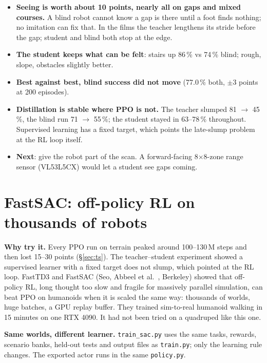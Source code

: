 \documentclass[10pt,letterpaper]{article}
\newcommand{\key}[1]{\textbf{#1}}
\begin{document}
\begin{itemize}
\item \key{Seeing is worth about 10 points, nearly all on gaps and mixed courses.} A blind robot cannot know a gap is there until a
foot finds nothing; no imitation can fix that. In the films the teacher lengthens its stride before the gap; student and blind both
stop at the edge.
\item \key{The student keeps what can be felt}: stairs up 86\,\% vs 74\,\% blind; rough, slope, obstacles slightly better.
\item \key{Best against best, blind success did not move} (77.0\,\% both, $\pm$3 points at 200 episodes).
\item \key{Distillation is stable where PPO is not.} The teacher slumped 81 $\to$ 45\,\%, the blind run 71 $\to$ 55\,\%; the student
stayed in 63–78\,\% throughout. Supervised learning has a fixed target, which points the late-slump problem at the RL loop itself.
\item \key{Next}: give the robot part of the scan. A forward-facing 8$\times$8-zone range sensor (VL53L5CX) would let a student see gaps coming.
\end{itemize}

\section{FastSAC: off-policy RL on thousands of robots}\label{sec:fsac}

\textbf{Why try it.} Every PPO run on terrain peaked around 100–130\,M steps and then lost 15–30 points (§\ref{sec:ts}). The
teacher–student experiment showed a supervised learner with a fixed target does not slump, which pointed at the RL loop.
FastTD3 and FastSAC (Seo, Abbeel et al.~\cite{seo2025fasttd3,seo2025fastsac}, Berkeley) showed that off-policy RL, long
thought too slow and fragile for massively parallel simulation, can beat PPO on humanoids when it is scaled the same way: thousands
of worlds, huge batches, a GPU replay buffer. They trained sim-to-real humanoid walking in 15 minutes on one RTX 4090. It had not
been tried on a quadruped like this one.

\textbf{Same worlds, different learner.} \texttt{train\_sac.py} uses the same tasks, rewards, scenario banks, held-out tests
and output files as \texttt{train.py}; only the learning rule changes. The exported actor runs in the same \texttt{policy.py}.
\end{document}
